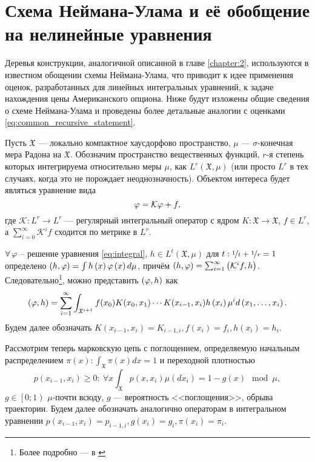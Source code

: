 \chapter{Схема Неймана-Улама и её обобщение на нелинейные уравнения}
Деревья конструкции, аналогичной описанной в главе \ref{chapter:2}, используются в известном обощении схемы Неймана-Улама, что приводит к идее применения оценок, разработанных для линейных интегральных уравнений, к задаче нахождения цены Американского опциона. Ниже будут изложены общие сведения о схеме Неймана-Улама и проведены более детальные аналогии с оценками \eqref{eq:common_recursive_statement}.

Пусть $\mathfrak{X}$ --- локально компактное хаусдорфово пространство, $\mu$ --- $\sigma$-конечная мера Радона на $\mathfrak{X}$. Обозначим пространство вещественных функций, $r$-я степень которых интегрируема относительно меры $\mu$, как $L^r\left(\mathfrak{X}, \mu\right)$ (или просто $L^r$ в тех случаях, когда это не порождает неоднозначность). Объектом интереса будет являться уравнение вида
\begin{equation} \label{eq:integral}
	\varphi = \mathcal{K}\varphi + f,
\end{equation}
где $\mathcal{K}: L^r \to L^r$ --- регулярный интегральный оператор с ядром $K: \mathfrak{X}\to \mathfrak{X}$, $f\in L^r$, а $\sum_{i=0}^\infty \mathcal{K}^i f$ сходится по метрике в $L^r$.

$\forall\,\varphi$ -- решение уравнения \eqref{eq:integral}, $h\in L^t\left(\mathfrak{X}, \mu\right)$ для $t:\nicefrac{1}{t} + \nicefrac{1}{r} = 1$ определено $\left(h, \varphi\right) = \int h\left(x\right)\varphi\left(x\right) d\mu$, причём $\left(h,\varphi\right) = \sum_{i=1}^\infty \left(\mathcal{K}^i f, h\right)$. Следовательно\footnote{Более подробно --- в \cite{montekarlo1975}}, можно представить $\left(\varphi,h\right)$ как
\begin{equation}
	\left(\varphi, h\right) = \sum_{i=1}^\infty \int_{\mathfrak{X}^{i+1}}f(x_0)K(x_0, x_1)\cdots K(x_{i-1}, x_i)h\left(x_i\right)\mu^id\left(x_1,\ldots,x_i\right).
\end{equation}
Будем далее обозначать $K\left(x_{i-1}, x_i\right) = K_{i-1, i}, f\left(x_i\right) = f_i, h\left(x_i\right) = h_i$.

Рассмотрим теперь марковскую цепь с поглощением, определяемую начальным распределением $\pi\left(x\right): \int_{\mathfrak{X}} \pi(x) dx = 1$ и переходной плотностью 
$$p\left(x_{i-1}, x_i\right) \geq 0 : \:\forall x \int_\mathfrak{X} p(x, x_i)\mu(dx_i) = 1 - g(x) \mod \mu,$$
$g\in\left[0;1\right)$ $\mu$-почти всюду, $g$ --- вероятность <<поглощения>>, обрыва траектории. Будем далее обозначать аналогично операторам в интегральном уравнении $p\left(x_{i-1}, x_i\right) = p_{i-1, i}, g\left(x_i\right) = g_i, \pi\left(x_i\right) = \pi_i$.

